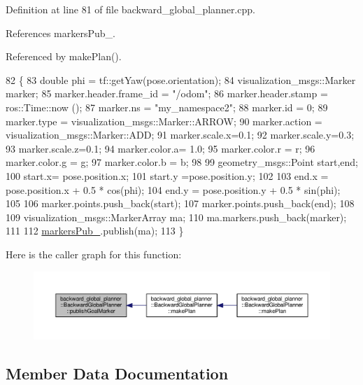 Definition at line 81 of file backward\+\_\+global\+\_\+planner.\+cpp.



References markers\+Pub\+\_\+.



Referenced by make\+Plan().


\begin{DoxyCode}
82 \{
83     \textcolor{keywordtype}{double} phi = tf::getYaw(pose.orientation);
84     visualization\_msgs::Marker marker;
85     marker.header.frame\_id = \textcolor{stringliteral}{"/odom"};
86     marker.header.stamp = ros::Time::now ();
87     marker.ns = \textcolor{stringliteral}{"my\_namespace2"};
88     marker.id = 0;
89     marker.type = visualization\_msgs::Marker::ARROW;
90     marker.action = visualization\_msgs::Marker::ADD;
91     marker.scale.x=0.1;
92     marker.scale.y=0.3;
93     marker.scale.z=0.1;
94     marker.color.a= 1.0;
95     marker.color.r = r;
96     marker.color.g = g;
97     marker.color.b = b;
98 
99     geometry\_msgs::Point start,end;
100     start.x= pose.position.x;
101     start.y =pose.position.y;
102 
103     end.x = pose.position.x + 0.5 * cos(phi);
104     end.y = pose.position.y + 0.5 * sin(phi);
105 
106     marker.points.push\_back(start);
107     marker.points.push\_back(end);
108 
109     visualization\_msgs::MarkerArray ma;
110     ma.markers.push\_back(marker);
111 
112     \hyperlink{classbackward__global__planner_1_1BackwardGlobalPlanner_a02e3724cf09622d3f107e3476040add4}{markersPub\_}.publish(ma);
113 \}
\end{DoxyCode}


Here is the caller graph for this function\+:
\nopagebreak
\begin{figure}[H]
\begin{center}
\leavevmode
\includegraphics[width=350pt]{classbackward__global__planner_1_1BackwardGlobalPlanner_af1211f3b9a8d1c35bb4ba3e17c7758e9_icgraph}
\end{center}
\end{figure}




\subsection{Member Data Documentation}
